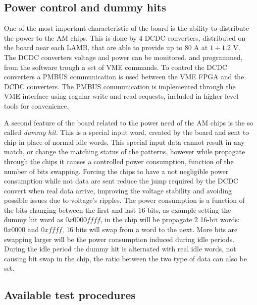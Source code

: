 \subsection{Power control and dummy hits}
\label{sec:powercontrol}

One of the most important characteristic of the board is the ability to distribute
the power to the AM chips. This is done by 4 DCDC converters, distributed on the
board near each LAMB, that are able to provide up to 80 A at $1\div1.2$ V. The
DCDC converters voltage and power can be monitored, and programmed, from the software
trough a set of VME commands.
To control the DCDC converters a PMBUS communication is used between the VME
FPGA and the DCDC converters. The PMBUS communication is implemented through the
VME interface using regular write and read requests, included in higher
level tools for convenience.

A second feature of the board related to the power need of the AM chips is
the so called \emph{dummy hit}. This is a special input word, created by the board
and sent to chip in place of normal idle words. This special input data cannot 
result in any match, or change the matching status of the patterns, however while
propagate through the chips it causes a controlled power consumption, function of
the number of bits swapping. Forcing the chips to have a not negligible power
consumption while not data are sent reduce the jump required by the DCDC convert
when real data arrive, improving the voltage stability and avoiding possible
issues due to voltage's ripples. The power consumption is a function of the 
bits changing between the first and last 16 bits, as example setting the dummy 
hit word as $0x0000ffff$, in the chip will be propagate 2 16-bit words: $0x0000$
and $0xffff$, 16 bits will swap from a word to the next. 
More bits are swapping larger will be the  power consumption induced during idle
periods. During the idle period the dummy hit is alternated with real idle words,
not causing bit swap in the chip, the ratio between the two type of data can also be
set.

\subsection{Available test procedures}

